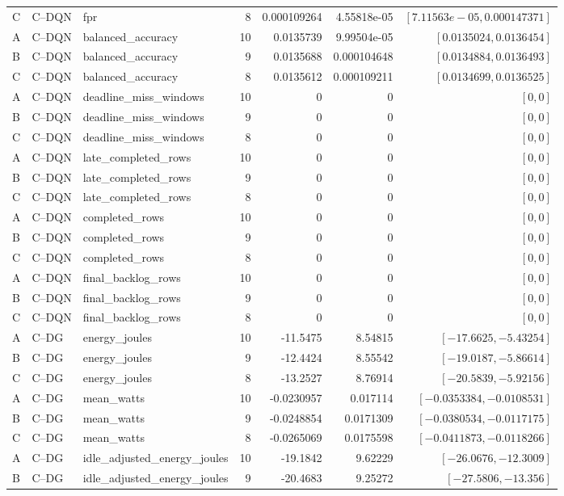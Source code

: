 \begin{longtable}{lllrrrr}
C & C--DQN & fpr & 8 & 0.000109264 & 4.55818e-05 & $[7.11563e-05,0.000147371]$\\
A & C--DQN & balanced\_accuracy & 10 & 0.0135739 & 9.99504e-05 & $[0.0135024,0.0136454]$\\
B & C--DQN & balanced\_accuracy & 9 & 0.0135688 & 0.000104648 & $[0.0134884,0.0136493]$\\
C & C--DQN & balanced\_accuracy & 8 & 0.0135612 & 0.000109211 & $[0.0134699,0.0136525]$\\
A & C--DQN & deadline\_miss\_windows & 10 & 0 & 0 & $[0,0]$\\
B & C--DQN & deadline\_miss\_windows & 9 & 0 & 0 & $[0,0]$\\
C & C--DQN & deadline\_miss\_windows & 8 & 0 & 0 & $[0,0]$\\
A & C--DQN & late\_completed\_rows & 10 & 0 & 0 & $[0,0]$\\
B & C--DQN & late\_completed\_rows & 9 & 0 & 0 & $[0,0]$\\
C & C--DQN & late\_completed\_rows & 8 & 0 & 0 & $[0,0]$\\
A & C--DQN & completed\_rows & 10 & 0 & 0 & $[0,0]$\\
B & C--DQN & completed\_rows & 9 & 0 & 0 & $[0,0]$\\
C & C--DQN & completed\_rows & 8 & 0 & 0 & $[0,0]$\\
A & C--DQN & final\_backlog\_rows & 10 & 0 & 0 & $[0,0]$\\
B & C--DQN & final\_backlog\_rows & 9 & 0 & 0 & $[0,0]$\\
C & C--DQN & final\_backlog\_rows & 8 & 0 & 0 & $[0,0]$\\
A & C--DG & energy\_joules & 10 & -11.5475 & 8.54815 & $[-17.6625,-5.43254]$\\
B & C--DG & energy\_joules & 9 & -12.4424 & 8.55542 & $[-19.0187,-5.86614]$\\
C & C--DG & energy\_joules & 8 & -13.2527 & 8.76914 & $[-20.5839,-5.92156]$\\
A & C--DG & mean\_watts & 10 & -0.0230957 & 0.017114 & $[-0.0353384,-0.0108531]$\\
B & C--DG & mean\_watts & 9 & -0.0248854 & 0.0171309 & $[-0.0380534,-0.0117175]$\\
C & C--DG & mean\_watts & 8 & -0.0265069 & 0.0175598 & $[-0.0411873,-0.0118266]$\\
A & C--DG & idle\_adjusted\_energy\_joules & 10 & -19.1842 & 9.62229 & $[-26.0676,-12.3009]$\\
B & C--DG & idle\_adjusted\_energy\_joules & 9 & -20.4683 & 9.25272 & $[-27.5806,-13.356]$\\

\end{longtable}
